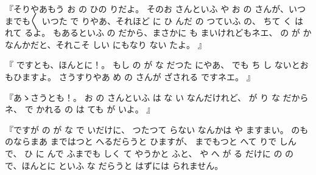 
『そりやあもう
お
の
ひの
りだよ。
そのお
さんといふ
や
お
の
さんが、いつまでも〳〵
いつた
で
りやあ、それほど
に
ひ
んだ
の
つていふ
の、
ちて
く
は
れて
るよ。
もあるといふ
の
だから、まさかに
も
まいけれどもネエ、
の
が
かなんかだと、それこそ
しい
にもなり
ない
たよ。
』

『
ですとも、ほんとに！。
もし
の
が
な
だつた
にやあ、
でも
ち
し
ないとおもひますよ。
さうすりやあ
め
の
さんが
ざされる
ですネエ。
』

『あゝさうとも！。
お
の
さんといふ
は
な
い
なんだけれど、
が
り
な
だからネ、
で
かれる
の
は
ても
が
いよ。
』

『ですが
の
が
な
で
いだけに、
つたつて
らない
なんかは
や
ますまい。
のものならまあ
まではつと
へるだらうと
ひますが、
までもつと
へて
りで
しんで、
ひ
に
んで
ふまでも
しく
て
やうかと
ふと、
や
へ
が
る
だけに
の
の
で、ほんとに
といふ
な
だらうと
はずには
られません。

